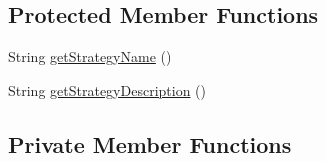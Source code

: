 \subsection*{Protected Member Functions}
\begin{DoxyCompactItemize}
\item 
String \hyperlink{classch_1_1zhaw_1_1ba10__bsha__1_1_1strategies_1_1MicroGestureDetectionStrategyPrediction_a68da2773da59d52a57a8c57b4695fe14}{getStrategyName} ()
\item 
String \hyperlink{classch_1_1zhaw_1_1ba10__bsha__1_1_1strategies_1_1MicroGestureDetectionStrategyPrediction_af62bea565c797e4313d5150b7d6335ca}{getStrategyDescription} ()
\end{DoxyCompactItemize}
\subsection*{Private Member Functions}
